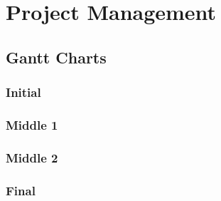\chapter{Project Management} \label{Project Management}
\section{Gantt Charts}
\subsection{Initial}
\subsection{Middle 1}
\subsection{Middle 2}
\subsection{Final}
